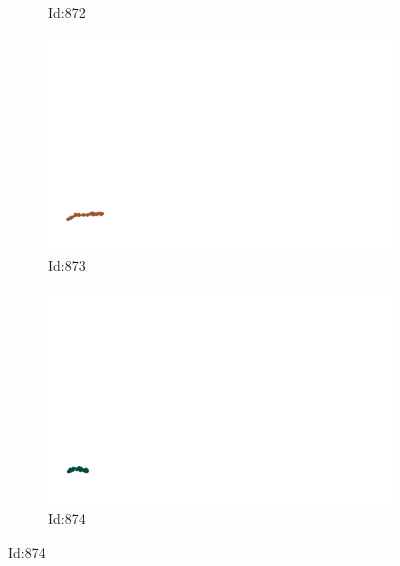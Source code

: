 \documentclass[12pt,twoside]{report}
\begin{document}
\begin{figure}
\begin{subfigure}[b]{0.20\textwidth}
\caption{Id:872}
\end{subfigure}
\begin{subfigure}[b]{0.20\textwidth}
\centering
\includegraphics[width=\textwidth]{../trajectories/873.png}
\caption{Id:873}
\end{subfigure}
\begin{subfigure}[b]{0.20\textwidth}
\centering
\includegraphics[width=\textwidth]{../trajectories/874.png}
\caption{Id:874}
\end{subfigure}
\end{figure}
\end{document}
